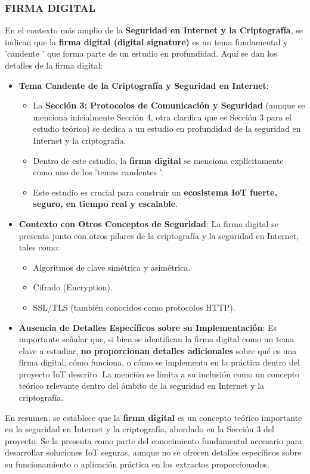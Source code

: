 \documentclass{report}
\begin{document}
\subsubsection{FIRMA DIGITAL}
En el contexto más amplio de la \textbf{Seguridad en Internet y la Criptografía}, se  indican que la \textbf{firma digital (digital 
signature)} es un tema fundamental y  'candente ' que forma parte de un estudio en profundidad. Aquí se dan los detalles de la firma digital:

\begin{itemize}
    \item \textbf{Tema Candente de la Criptografía y Seguridad en Internet}:
    \begin{itemize}
        \item La \textbf{Sección 3: Protocolos de Comunicación y Seguridad} (aunque se  menciona inicialmente Sección 4, otra clarifica que es 
        Sección 3 para el estudio teórico) se dedica a un estudio en profundidad de la seguridad en Internet y la criptografía.
        \item Dentro de este estudio, la \textbf{firma digital} se menciona explícitamente como uno de los  'temas candentes '.
        \item Este estudio es crucial para construir un \textbf{ecosistema IoT fuerte, seguro, en tiempo real y escalable}.
    \end{itemize}

    \item \textbf{Contexto con Otros Conceptos de Seguridad}: La firma digital se presenta junto con otros pilares de la criptografía y la seguridad 
    en Internet, tales como:
    \begin{itemize}
        \item Algoritmos de clave simétrica y asimétrica.
        \item Cifrado (Encryption).
        \item SSL/TLS (también conocidos como protocolos HTTP).
    \end{itemize}

    \item \textbf{Ausencia de Detalles Específicos sobre su Implementación}: Es importante señalar que, si bien se  identifican la firma 
    digital como un tema clave a estudiar, \textbf{no proporcionan detalles adicionales} sobre qué es una firma digital, cómo funciona, o cómo se 
    implementa en la práctica dentro del proyecto IoT descrito. La mención se limita a su inclusión como un concepto teórico relevante dentro del 
    ámbito de la seguridad en Internet y la criptografía.
\end{itemize}
En resumen, se  establece que la \textbf{firma digital} es un concepto teórico importante en la seguridad en Internet y la criptografía, 
abordado en la Sección 3 del proyecto. Se la presenta como parte del conocimiento fundamental necesario para desarrollar soluciones IoT seguras, 
aunque no se ofrecen detalles específicos sobre su funcionamiento o aplicación práctica en los extractos proporcionados.
\end{document}
